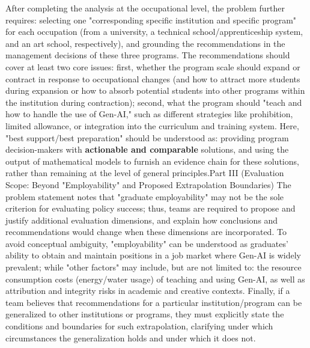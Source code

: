 After completing the analysis at the occupational level, the problem further requires: selecting one "corresponding specific institution and specific program" for each occupation (from a university, a technical school/apprenticeship system, and an art school, respectively), and grounding the recommendations in the management decisions of these three programs. The recommendations should cover at least two core issues: first, whether the program scale should expand or contract in response to occupational changes (and how to attract more students during expansion or how to absorb potential students into other programs within the institution during contraction); second, what the program should "teach and how to handle the use of Gen-AI," such as different strategies like prohibition, limited allowance, or integration into the curriculum and training system. Here, "best support/best preparation" should be understood as: providing program decision-makers with \textbf{actionable and comparable} solutions, and using the output of mathematical models to furnish an evidence chain for these solutions, rather than remaining at the level of general principles.Part III (Evaluation Scope: Beyond "Employability" and Proposed Extrapolation Boundaries)  
The problem statement notes that "graduate employability" may not be the sole criterion for evaluating policy success; thus, teams are required to propose and justify additional evaluation dimensions, and explain how conclusions and recommendations would change when these dimensions are incorporated. To avoid conceptual ambiguity, "employability" can be understood as graduates' ability to obtain and maintain positions in a job market where Gen-AI is widely prevalent; while "other factors" may include, but are not limited to: the resource consumption costs (energy/water usage) of teaching and using Gen-AI, as well as attribution and integrity risks in academic and creative contexts. Finally, if a team believes that recommendations for a particular institution/program can be generalized to other institutions or programs, they must explicitly state the conditions and boundaries for such extrapolation, clarifying under which circumstances the generalization holds and under which it does not.
